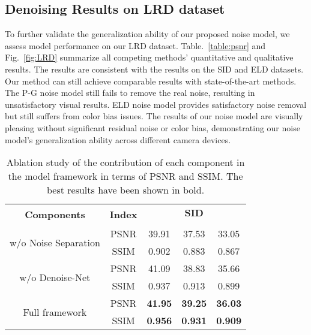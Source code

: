 \documentclass[10pt,twocolumn,letterpaper]{article}
\begin{document}
\vspace{-0.5em}
\subsection{Denoising Results on LRD dataset}
\vspace{-0.5em}
To further validate the generalization ability of our proposed noise model, we assess model performance on our LRD dataset. Table.~\ref{table:psnr} and Fig.~\ref{fig:LRD} summarize all competing methods' quantitative and qualitative results. The results are consistent with the results on the SID and ELD datasets. Our method can still achieve comparable results with state-of-the-art methods. The P-G noise model still fails to remove the real noise, resulting in unsatisfactory visual results. ELD noise model provides satisfactory noise removal but still suffers from color bias issues. The results of our noise model are visually pleasing without significant residual noise or color bias, demonstrating our noise model's generalization ability across different camera devices.

\begin{table}[t]
\centering
\caption{Ablation study of the contribution of each component in the model framework in terms of PSNR and SSIM. The best results have been shown in bold.}
\vspace{2pt}
\begin{tabular}{c|c|c|c|c}
\hline
\multirow{2}{*}{\textbf{Components}} & \multirow{2}{*}{\textbf{Index}} & \multicolumn{3}{c}{\textbf{SID}} \\\cline{3-5}
& & \textbf{} & \textbf{} & \textbf{} \\ \hline
\multirow{2}{*}{w/o Noise Separation} & PSNR &39.91 &37.53 &33.05 \\ \cline{2-5}
& SSIM &0.902 &0.883 &0.867  \\ \hline
\multirow{2}{*}{w/o Denoise-Net} & PSNR &41.09 &38.83 &35.66 \\ \cline{2-5}
& SSIM &0.937 &0.913 &0.899  \\ \hline
\multirow{2}{*}{Full framework} & PSNR &\textbf{41.95} &\textbf{39.25} &\textbf{36.03} \\ \cline{2-5}
& SSIM &\textbf{0.956} &\textbf{0.931} &\textbf{0.909}\\\hline
\end{tabular}
\label{table:ablation2}
\vspace{-2ex}
\end{table}
\end{document}
